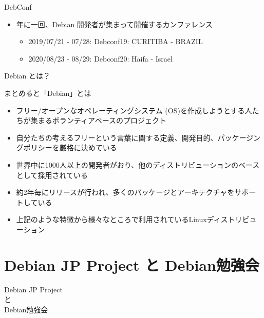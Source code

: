 \begin{frame}{DebConf}%

\begin{itemize}
\item 年に一回、Debian 開発者が集まって開催するカンファレンス
  \begin{itemize}
  \item 2019/07/21 - 07/28: Debconf19: CURITIBA - BRAZIL
  \item 2020/08/23 - 08/29: Debconf20: Haifa - Israel
  \end{itemize}
\end{itemize}

\begin{center}
\end{center}

\end{frame}


\begin{frame}{Debian とは？}
  
まとめると「Debian」とは

\begin{itemize}
  \item フリー/オープンなオペレーティングシステム (OS)を作成しようとする人たちが集まるボランティアベースのプロジェクト
  \item 自分たちの考えるフリーという言葉に関する定義、開発目的、パッケージングポリシーを厳格に決めている
  \item 世界中に1000人以上の開発者がおり、他のディストリビューションのベースとして採用されている
  \item 約2年毎にリリースが行われ、多くのパッケージとアーキテクチャをサポートしている
  \item 上記のような特徴から様々なところで利用されているLinuxディストリビューション
\end{itemize}

\end{frame}



\section{Debian JP Project と Debian勉強会}


\begin{frame}
  \begin{center}\Huge{Debian JP Project\\と\\Debian勉強会}\end{center}
\end{frame}

